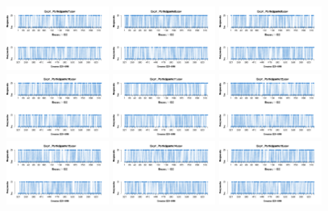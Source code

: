 \begin{figure}[th]
\includegraphics[width=0.30\textwidth]{Figures/Response_Exp1_P7} \includegraphics[width=0.30\textwidth]{Figures/Response_Exp1_P8} \includegraphics[width=0.30\textwidth]{Figures/Response_Exp1_P9}
\includegraphics[width=0.30\textwidth]{Figures/Response_Exp1_P10} \includegraphics[width=0.30\textwidth]{Figures/Response_Exp1_P11} \includegraphics[width=0.30\textwidth]{Figures/Response_Exp1_P12}
\includegraphics[width=0.30\textwidth]{Figures/Response_Exp1_P13} \includegraphics[width=0.30\textwidth]{Figures/Response_Exp1_P14} \includegraphics[width=0.30\textwidth]{Figures/Response_Exp1_P15}

\end{figure}
